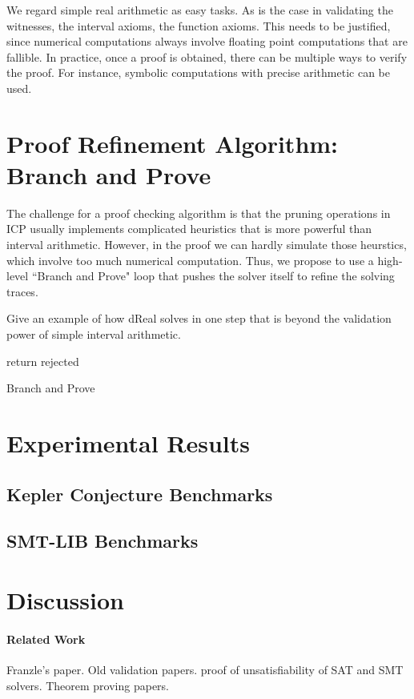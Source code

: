 \documentclass[envcountsect]{llncs}
\begin{document}
\begin{remark}
We regard simple real arithmetic as easy tasks. 
As is the case in validating the witnesses, the interval axioms, the function
axioms. This needs to be justified, since numerical computations always involve
floating point computations that are fallible. In practice, once a proof is
obtained, there can be multiple ways to verify the proof. For instance, symbolic
computations with precise arithmetic can be used.  
\end{remark}

\section{Proof Refinement Algorithm: Branch and Prove}

The challenge for a proof checking algorithm is that the pruning operations in
ICP usually implements complicated heuristics that is more powerful than
interval arithmetic. However, in the proof we can hardly simulate those
heurstics, which involve too much numerical computation. Thus, we propose to use
a high-level ``Branch and Prove" loop that pushes the solver itself to refine
the solving traces. 

\begin{example}
Give an example of how dReal solves in one step that is beyond the validation
power of simple interval arithmetic. 
\end{example}

\begin{algorithm}\label{algo1}
\BlankLine
{}
return {\sf rejected}\;
\caption{Branch and Prove}
\end{algorithm}


\section{Experimental Results}

\subsection{Kepler Conjecture Benchmarks}

\subsection{SMT-LIB Benchmarks}

\section{Discussion}

\paragraph{Related Work} 
Franzle's paper. Old validation papers. proof of unsatisfiability of SAT and
SMT solvers. Theorem proving papers.




\end{document}
